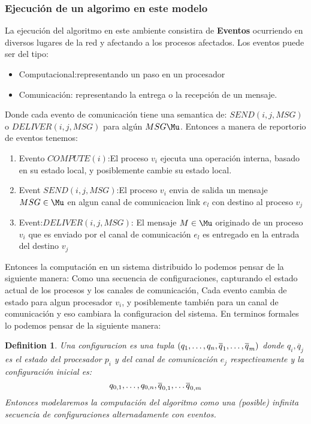 \documentclass[10pt]{report}
\newtheorem{definition}{Definition}
\begin{document}
    \subsubsection{Ejecución de un algorimo en este modelo}
    La ejecución del algoritmo en este ambiente consistira de \textbf{Eventos} ocurriendo en diversos
    lugares de la red y afectando a los procesos afectados.
    Los eventos puede ser del tipo:
    \begin{itemize}
        \item Computacional:representando un paso en un procesador
        \item Comunicación: representando la entrega o la recepción de un mensaje.
    \end{itemize}
    Donde cada evento de comunicación tiene una semantica de:
    $SEND(i,j,MSG)$ o $DELIVER(i,j,MSG)$ para algún $MSG\Mu$.
    Entonces a manera de reportorio de eventos tenemos:
    \begin{enumerate}
        \item Evento $COMPUTE(i)$:El proceso $v_{i}$ ejecuta una operación interna, basado en su estado local, y
        posiblemente cambie su estado local.
        \item Event $SEND(i,j,MSG)$:El proceso $v_{i}$ envia de salida un mensaje $MSG\in \Mu$ en algun canal de
        comunicacion link $e_{l}$ con destino al proceso $v_{j}$
        \item Event:$DELIVER(i,j,MSG)$: El mensaje $M\in \Mu$ originado de un proceso $v_{i}$
        que es enviado por el canal de comunicación $e_{l}$ es entregado en la entrada del destino $v_{j}$
    \end{enumerate}
    Entonces la computación en un sistema distribuido lo podemos pensar de la siguiente manera:
    Como una secuencia de configuraciones, capturando el estado actual de los procesos y los canales de comunicación,
    Cada evento cambia de estado para algun procesador $v_{i}$, y posiblemente también para un canal de comunicación
    y eso cambiara la configuracion del sistema.
    En terminos formales lo podemos pensar de la siguiente manera:
    \theoremstyle{definition}
    \begin{definition}
        Una configuracion es una tupla $(q_{1},\mathellipsis,q_{n},\overline{q}_{1},\mathellipsis,\overline{q}_{m})$
        donde $q_{i},\overline{q}_{j}$ es el estado del procesador $p_{i}$ y del canal de comunicación $e_{j}$ respectivamente
        y la configuración inicial es:
        \begin{equation}
        q_{0,1},\mathellipsis,q_{0,n},\overline{q}_{0,1},\mathellipsis \overline{q}_{0,m}
        \end{equation}
        Entonces modelaremos la computación del algoritmo como una (posible) infinita secuencia de configuraciones
        alternadamente con eventos.
    \end{definition}
\end{document}
